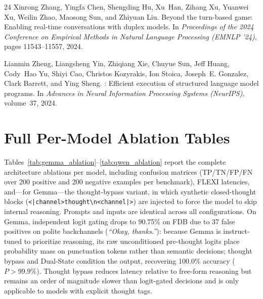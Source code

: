 \documentclass{article}
\begin{document}
\begin{thebibliography}{24}
Xinrong Zhang, Yingfa Chen, Shengding Hu, Xu~Han, Zihang Xu, Yuanwei Xu, Weilin Zhao, Maosong Sun, and Zhiyuan Liu.
\newblock Beyond the turn-based game: Enabling real-time conversations with duplex models.
\newblock In \emph{Proceedings of the 2024 Conference on Empirical Methods in Natural Language Processing (EMNLP '24)}, pages 11543--11557, 2024.

Lianmin Zheng, Liangsheng Yin, Zhiqiang Xie, Chuyue Sun, Jeff Huang, Cody~Hao Yu, Shiyi Cao, Christos Kozyrakis, Ion Stoica, Joseph~E. Gonzalez, Clark Barrett, and Ying Sheng.
: Efficient execution of structured language model programs.
\newblock In \emph{Advances in Neural Information Processing Systems (NeurIPS)}, volume~37, 2024.

\end{thebibliography}

\appendix

\section{Full Per-Model Ablation Tables}
\label{app:full_tables}

Tables~\ref{tab:gemma_ablation}--\ref{tab:qwen_ablation} report the complete architecture ablations per model, including confusion matrices (TP/TN/FP/FN over 200 positive and 200 negative examples per benchmark), FLEXI latencies, and---for Gemma---the thought-bypass variant, in which synthetic closed-thought blocks (\texttt{<|channel>thought\textbackslash n<channel|>}) are injected to force the model to skip internal reasoning. Prompts and inputs are identical across all configurations. On Gemma, independent logit gating drops to 90.75\% on FDB due to 37 false positives on polite backchannels (\emph{``Okay, thanks.''}): because Gemma is instruct-tuned to prioritize reasoning, its raw unconditioned pre-thought logits place probability mass on punctuation tokens rather than semantic decisions; thought bypass and Dual-State condition the output, recovering 100.0\% accuracy ($P > 99.9\%$). Thought bypass reduces latency relative to free-form reasoning but remains an order of magnitude slower than logit-gated decisions and is only applicable to models with explicit thought tags.
\end{document}
